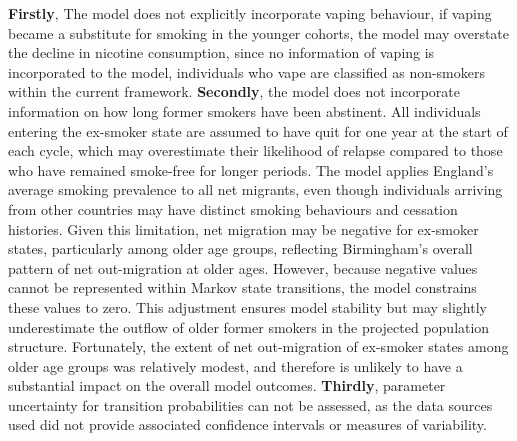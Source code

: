 \documentclass[
  letterpaper,
  DIV=11,
  numbers=noendperiod]{scrartcl}
\begin{document}
\textbf{Firstly}, The model does not explicitly incorporate vaping
behaviour, if vaping became a substitute for smoking in the younger
cohorts, the model may overstate the decline in nicotine consumption,
since no information of vaping is incorporated to the model, individuals
who vape are classified as non-smokers within the current framework.
\textbf{Secondly}, the model does not incorporate information on how
long former smokers have been abstinent. All individuals entering the
ex-smoker state are assumed to have quit for one year at the start of
each cycle, which may overestimate their likelihood of relapse compared
to those who have remained smoke-free for longer periods. The model
applies England's average smoking prevalence to all net migrants, even
though individuals arriving from other countries may have distinct
smoking behaviours and cessation histories. Given this limitation, net
migration may be negative for ex-smoker states, particularly among older
age groups, reflecting Birmingham's overall pattern of net out-migration
at older ages. However, because negative values cannot be represented
within Markov state transitions, the model constrains these values to
zero. This adjustment ensures model stability but may slightly
underestimate the outflow of older former smokers in the projected
population structure. Fortunately, the extent of net out-migration of
ex-smoker states among older age groups was relatively modest, and
therefore is unlikely to have a substantial impact on the overall model
outcomes. \textbf{Thirdly}, parameter uncertainty for transition
probabilities can not be assessed, as the data sources used did not
provide associated confidence intervals or measures of variability.
\end{document}
